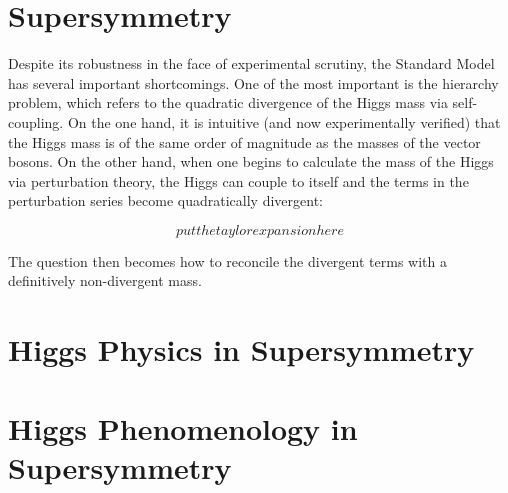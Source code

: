 \documentclass[11pt]{article}
\begin{document}
 
 
\section{Supersymmetry}
Despite its robustness in the face of experimental scrutiny, the Standard Model has several important shortcomings.  One of the most important is the hierarchy problem, which refers to the quadratic divergence of the Higgs mass via self-coupling.  On the one hand, it is intuitive (and now experimentally verified) that the Higgs mass is of the same order of magnitude as the masses of the vector bosons.  On the other hand, when one begins to calculate the mass of the Higgs via perturbation theory, the Higgs can couple to itself and the terms in the perturbation series become quadratically divergent:

\begin{equation}
put the taylor expansion here
\end{equation}

The question then becomes how to reconcile the divergent terms with a definitively non-divergent mass.  


\section{Higgs Physics in Supersymmetry}

\section{Higgs Phenomenology in Supersymmetry}
\end{document}
